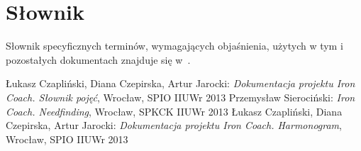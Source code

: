 \section{Słownik}
\noindent Słownik specyficznych terminów, wymagających objaśnienia, użytych w tym i pozostałych dokumentach znajduje się w~\cite{Sł}.
\begin{thebibliography}{99}
   Łukasz Czapliński, Diana Czepirska, Artur Jarocki: {\it Dokumentacja projektu Iron Coach. Słownik pojęć}, Wrocław, SPIO IIUWr 2013
   Przemysław Sierociński: {\it Iron Coach. Needfinding}, Wrocław, SPKCK IIUWr 2013
   Łukasz Czapliński, Diana Czepirska, Artur Jarocki: {\it Dokumentacja projektu Iron Coach. Harmonogram}, Wrocław, SPIO IIUWr 2013
\end{thebibliography}

